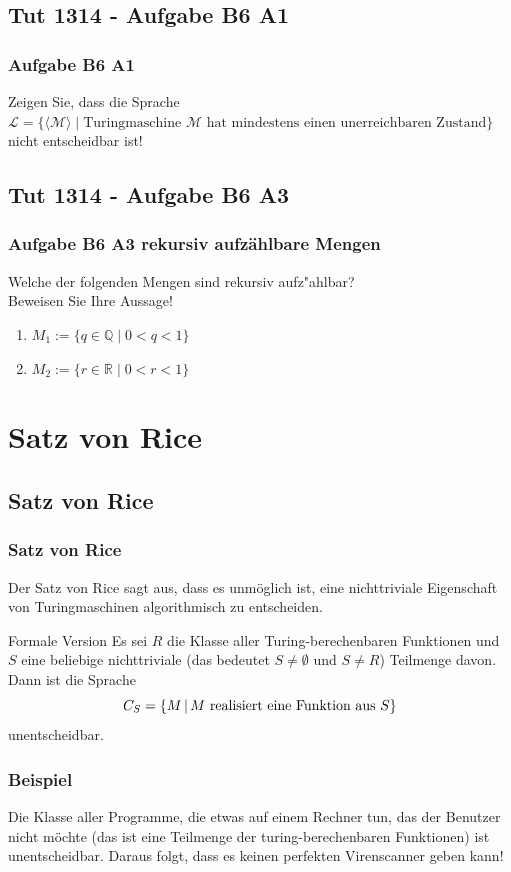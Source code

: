 \subsection{Tut 1314 - Aufgabe B6 A1}
\begin{frame}
	\frametitle{Aufgabe B6 A1}
	Zeigen Sie, dass die Sprache \\ $\mathcal{L} = \{\langle\mathcal{M}\rangle \; | \; \mbox{Turingmaschine $\mathcal{M}$ hat mindestens einen unerreichbaren Zustand}\}$ \\ nicht entscheidbar ist!
\end{frame}

\subsection{Tut 1314 - Aufgabe B6 A3}
\begin{frame}
	\frametitle{Aufgabe B6 A3 rekursiv aufzählbare Mengen}
	Welche der folgenden Mengen sind rekursiv aufz"ahlbar? \\
	Beweisen Sie Ihre Aussage!
	\begin{enumerate}
		\item $M_1 := \{q \in \mathbb{Q} \; | \; 0<q<1\}$
		\item $M_2 := \{r \in \mathbb{R} \; | \; 0<r<1\}$
	\end{enumerate}
\end{frame}

\section{Satz von Rice}
\subsection{Satz von Rice}
\begin{frame}
\frametitle{Satz von Rice}
Der Satz von Rice sagt aus, dass es unmöglich ist, eine nichttriviale Eigenschaft von Turingmaschinen algorithmisch zu entscheiden.
\begin{block}{Formale Version}
Es sei $R$ die Klasse aller Turing-berechenbaren Funktionen und $S$ eine beliebige nichttriviale (das bedeutet $S \neq \emptyset$ und $S \neq R$) Teilmenge davon. Dann ist die Sprache
$$ C_S = \left\lbrace M \,\middle\vert\, M \text{ realisiert eine Funktion aus } S \right\rbrace $$
unentscheidbar. 
\end{block}
\end{frame}
\begin{frame}
\frametitle{Beispiel}
Die Klasse aller Programme, die etwas auf einem Rechner tun, das der Benutzer nicht möchte (das ist eine Teilmenge der turing-berechenbaren Funktionen) ist unentscheidbar. Daraus folgt, dass es keinen perfekten Virenscanner geben kann!
\end{frame}


